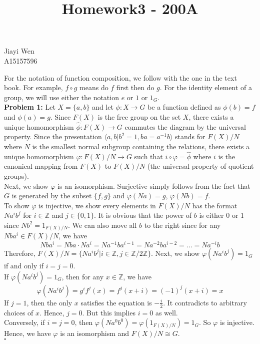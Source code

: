 \documentclass[12pt]{amsart}
\newcommand{\Z}{\mathbb{Z}}
\begin{document}
    \title{Homework3 - 200A}
    \maketitle
    \begin{center}
        Jiayi Wen\\
        A15157596
    \end{center}
    \indent For the notation of function composition, we follow with the one in the text book. For example, $f \circ g$ means do $f$ first then do $g$. For the identity element of a group, we will use either the notation $e$ or $1$ or $1_G$.\\
\noindent \textbf{Problem 1:} Let $X=\{a,b\}$ and let $\phi: X\rightarrow G$ be a function defined as $\phi(b)=f $ and $\phi(a)=g$. Since $F(X)$ is the free group on the set $X$, there exists a unique homomorphism $\hat{\phi}: F(X)\rightarrow G$ commutes the diagram by the universal property. Since the presentation $\langle a,b|b^2=1,ba=a^{-1}b\rangle $ stands for $F(X)/N$ where $N$ is the smallest normal subgroup containing the relations, there exists a unique homomorphism $\varphi:F(X)/N \to G$ such that $i\circ \varphi =\hat{\phi}$ where $i$ is the canonical mapping from $F(X)$ to $F(X)/N$ (the universal property of quotient groups).\\
Next, we show $\varphi$ is an isomorphism. Surjective simply follows from the fact that $G$ is generated by the subset $\{f,g\}$ and $\varphi(Na)=g$, $\varphi(Nb)=f$.\\
To show $\varphi$ is injective, we show every elements in $F(X)/N$ has the format $Na^ib^j$ for $i\in \Z$ and $j\in\{0,1\}$. It is obvious that the power of $b$ is either 0 or 1 since $Nb^2=1_{F(X)/N}$. We can also move all $b$ to the right since for any $Nba^i\in F(X)/N$, we have 
\[Nba^i=Nba\cdot Na^i=Na^{-1}ba^{i-1}=Na^{-2}ba^{i-2}=\dots =Na^{-i}b\]
Therefore, $F(X)/N=\{Na^ib^j|i\in\Z, j\in\Z/2\Z\}$. Next, we show $\varphi(Na^ib^j)=1_G$ if and only if $i=j=0$.\\
If $\varphi(Na^ib^j)=1_G$, then for any $x\in \Z$, we have 
\[\varphi(Na^ib^j)=g^if^j(x)=f^j(x+i)=(-1)^j(x+i)=x\]
If $j=1$, then the only $x$ satisfies the equation is $-\frac{i}{2}$. It contradicts to arbitrary choices of $x$. Hence, $j=0$. But this implies $i=0$ as well.\\
Conversely, if $i=j=0$, then $\varphi(Na^0b^0)=\varphi(1_{F(X)/N})=1_G$. So $\varphi$ is injective. Hence, we have $\varphi$ is an isomorphism and $F(X)/N\cong G$.
\\\phantom{qed}\hfill$\square$\\
\end{document}
